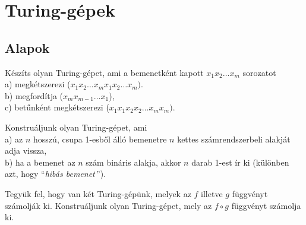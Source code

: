 \chapter{Turing-g\'epek}

\section{Alapok}

\begin{Exercise}[counter={sorszam}, difficulty=0] 
	Készíts olyan Turing-gépet, ami a bemenetként kapott $x_1x_2\ldots x_m$ sorozatot\\
a) megkétszerezi ($x_1x_2\ldots x_m x_1x_2\ldots x_m)$.\\
b) megford\'itja ($x_mx_{m-1}\ldots x_1$),\\
c) bet\H unként megkétszerezi ($x_1x_1x_2x_2\ldots x_m x_m)$.
\end{Exercise}	 


\begin{Exercise}[counter={sorszam}, difficulty=0]
	 Konstruáljunk olyan Turing-gépet, ami\\
a) az $n$ hosszú, csupa 1-esb\H ol álló bemenetre $n$ kettes számrendszerbeli alakját adja vissza,\\
b) ha a bemenet az $n$ szám bináris alakja, akkor $n$ darab 1-est ír ki (különben azt, hogy ``{\it hibás bemenet}\,'').
\end{Exercise}	 


\begin{Exercise}[counter={sorszam}, difficulty=0]
	 Tegyük fel, hogy van két Turing-gépünk, melyek az $f$ illetve $g$ függvényt számolják ki. Konstruáljunk olyan Turing-gépet, mely az $f\circ g$ függvényt számolja ki.
\end{Exercise}	 


